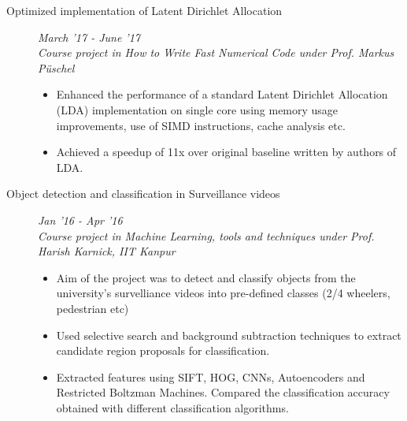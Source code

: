 \documentclass[9pt]{article}
\newenvironment{changemargin}[2]{%
  \begin{list}{}{%
    \setlength{\topsep}{0pt}%
    \setlength{\leftmargin}{#1}%
    \setlength{\rightmargin}{#2}%
    \setlength{\listparindent}{\parindent}%
    \setlength{\itemindent}{\parindent}%
    \setlength{\parsep}{\parskip}%
  }%
  \item[]}{\end{list}
}
\newenvironment{body} {
	\vspace*{-16pt}
	\begin{changemargin}{-0.6in}{-0.65in}
  }	
	{\end{changemargin}
}
\begin{document}
\begin{body}
\begin{description}
	\item[\normalsize{Optimized implementation of Latent Dirichlet Allocation}]
	\hfill \textit{March '17 - June '17} \\
	\textit{Course project in How to Write Fast Numerical Code under Prof. Markus P{\"u}schel}
	\begin{itemize}
		\item Enhanced the performance of a standard Latent Dirichlet Allocation (LDA)
		implementation on single core using memory usage improvements, use of SIMD instructions, cache analysis etc.
		\item Achieved a speedup of 11x over original baseline written by authors of LDA.
	\end{itemize}
      
	 \item[\normalsize{Object detection and classification in Surveillance videos}] \hfill  \textit{Jan '16 - Apr '16} \\
	  \textit{Course project in Machine Learning, tools and techniques under Prof. Harish Karnick, IIT Kanpur}
	  \begin{itemize}
            \item Aim of the project was to detect and classify objects from the university's survelliance videos into pre-defined classes (2/4 wheelers, pedestrian etc)
            \item Used selective search and background subtraction techniques to extract candidate region proposals for classification. 
            \item Extracted features using SIFT, HOG, CNNs, Autoencoders and Restricted Boltzman Machines. Compared the classification accuracy obtained with different classification algorithms.
	  \end{itemize}



\end{description}
\end{body}
\end{document}

